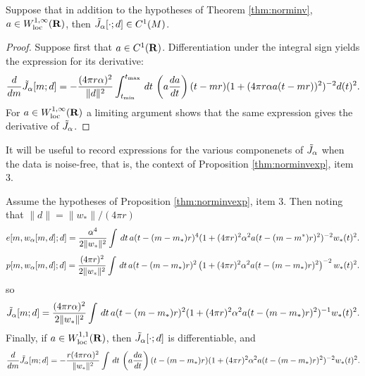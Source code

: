 \begin{theorem}
  \label{thm:diffobj}
  Suppose that in addition to the hypotheses of Theorem
  \ref{thm:norminv}, $a \in W^{1,\infty}_{\rm loc}({\bf R})$, then $\tilde{J}_{\alpha}[\cdot;d]
  \in C^1(M)$.
\end{theorem}

\begin{proof}
Suppose first that $a \in C^1({\bf R})$. Differentiation under the integral sign  
  yields the expression for its derivative:
\begin{equation}
  \label{eqn:dexpjgen}
  \frac{d}{dm}\tilde{J}_{\alpha}[m;d] = -\frac{(4 \pi r \alpha)^2}{\|d\|^2} \int_{t_{\rm min}}^{t_{\rm max}} \,dt \, 
  \left(a\frac{da}{dt}\right)(t-mr)(1+(4\pi r \alpha 
  a(t-mr))^2)^{-2}d(t)^2. 
\end{equation}
For $a \in W^{1,\infty}_{\rm loc}({\bf R})$ a limiting argument shows that the
same expression gives the derivative of $\tilde{J}_{\alpha}$.
\end{proof}

It will be useful to record expressions for the various componenets of
$\tilde{J}_{\alpha}$ when the data is noise-free, that is, the context of
Proposition \ref{thm:norminvexp}, item 3.

\begin{corollary}
  \label{thm:epjnonoise}
  Assume the hypotheses of Proposition \ref{thm:norminvexp}, item
  3. Then noting that $\|d\| = \|w_*\|/(4 \pi r)$
\begin{equation}
  \label{eqn:residnorm}
  e[m,w_{\alpha}[m,d];d] 
= \frac{\alpha^4}{2\|w_*\|^2}\int\,dt\,a(t-(m-m_*)r)^4(1+(4\pi r)^2 \alpha^2 
    a(t-(m-m^*)r)^2)^{-2}w_*(t)^2.
\end{equation}
\begin{equation}
  \label{eqn:anninorm}
  p[m,w_{\alpha}[m,d];d] = \frac{(4\pi r)^2}{2\|w_*\|^2}\int \,dt\,  a(t-(m-m_*)r)^2 \left(1+ (4\pi r)^2\alpha^2
    a(t-(m-m_*)r)^2\right)^{-2}w_*(t)^2.
\end{equation}
so 
\begin{equation}
\label{eqn:expjnonoise}
\tilde{J}_{\alpha}[m;d] = \frac{(4\pi r \alpha)^2}{2\|w_*\|^2}\int\,dt\,a(t-(m-m_*)r)^2(1+(4\pi r)^2 \alpha^2 
  a(t-(m-m_*)r)^2)^{-1}w_*(t)^2. 
\end{equation}
Finally, if $a \in W^{1,1}_{\rm loc}({\bf R})$, then $\tilde{J}_{\alpha}[\cdot;d]$ is differentiable, and 
\begin{equation}
  \label{eqn:dexpjnonoise}
  \frac{d}{dm}\tilde{J}_{\alpha}[m;d] = -\frac{r (4\pi r \alpha)^2}{\|w_*\|^2} \int \,dt \, 
  \left(a\frac{da}{dt}\right)(t-(m-m_*)r)(1+(4\pi r)^2 \alpha^2 
  a(t-(m-m_*)r)^2)^{-2}w_*(t)^2. 
\end{equation}
\end{corollary}

